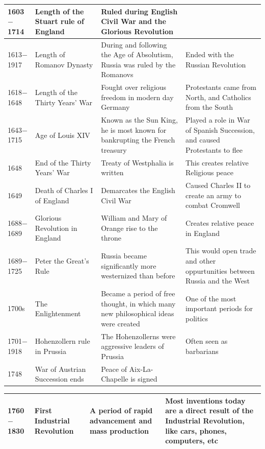 \documentclass[12pt]{article}
\begin{document}
\begin{enumerate}
\begin{tabular}{|p{}|p{}|p{}|p{}|}
\hline
1603$-$1714 & Length of the Stuart rule of England  & Ruled during English Civil War and the Glorious Revolution  & \\
\hline
1613$-$1917 & Length of Romanov Dynasty  & During and following the Age of Absolutism, Russia was ruled by the Romanovs  & Ended with the Russian Revolution  \\
\hline
1618$-$1648 & Length of the Thirty Years' War  & Fought over religious freedom in modern day Germany  & Protestants came from North, and Catholics from the South  \\
\hline
1643$-$1715 & Age of Louis XIV  & Known as the Sun King, he is most known for bankrupting the French treasury & Played a role in War of Spanish Succession, and caused Protestants to flee \\
\hline
1648 & End of the Thirty Years' War & Treaty of Westphalia is written & This creates relative Religious peace \\
\hline
1649 & Death of Charles I of England & Demarcates the English Civil War  & Caused Charles II to create an army to combat Cromwell \\
\hline
1688$-$1689 & Glorious Revolution in England & William and Mary of Orange rise to the throne & Creates relative peace in England \\
\hline
1689$-$1725 & Peter the Great's Rule & Russia became significantly more westernized than before  & This would open trade and other oppurtunities between Russia and the West  \\
\hline
1700s & The Enlightenment  & Became a period of free thought, in which many new philosophical ideas were created  & One of the most important periods for politics  \\
\hline
1701$-$1918 & Hohenzollern rule in Prussia & The Hohenzollerns were aggressive leaders of Prussia  & Often seen as barbarians \\
\hline
1748 & War of Austrian Succession ends  & Peace of Aix-La-Chapelle is signed  & \\
\hline
\end{tabular}
\newpage
\hspace{-25pt}\begin{tabular}{|p{}|p{}|p{}|p{}|}
\hline
1760$-$1830 & First Industrial Revolution  & A period of rapid advancement and mass production  & Most inventions today are a direct result of the Industrial Revolution, like cars, phones, computers, etc  \\
\hline

\end{tabular}
\end{enumerate}
\end{document}
